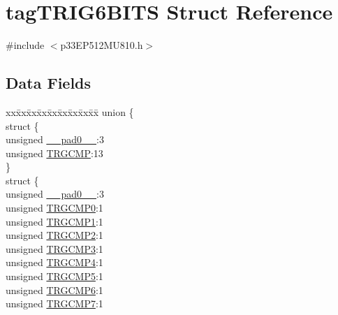\hypertarget{structtag_t_r_i_g6_b_i_t_s}{}\section{tag\+T\+R\+I\+G6\+B\+I\+TS Struct Reference}
\label{structtag_t_r_i_g6_b_i_t_s}


{\ttfamily \#include $<$p33\+E\+P512\+M\+U810.\+h$>$}

\subsection*{Data Fields}
\begin{DoxyCompactItemize}
\item 
\begin{tabbing}
xx\=xx\=xx\=xx\=xx\=xx\=xx\=xx\=xx\=\kill
union \{\\
\>struct \{\\
\>\>unsigned \hyperlink{structtag_t_r_i_g6_b_i_t_s_adf71f3d8410c1f1dbbc96680a92c49af}{\_\_pad0\_\_}:3\\
\>\>unsigned \hyperlink{structtag_t_r_i_g6_b_i_t_s_aceafdcd310f8a6833f64c9d20ec5567e}{TRGCMP}:13\\
\>\} \\
\>struct \{\\
\>\>unsigned \hyperlink{structtag_t_r_i_g6_b_i_t_s_adf71f3d8410c1f1dbbc96680a92c49af}{\_\_pad0\_\_}:3\\
\>\>unsigned \hyperlink{structtag_t_r_i_g6_b_i_t_s_a592102a5d0362674b8b287b5f8dd9f2a}{TRGCMP0}:1\\
\>\>unsigned \hyperlink{structtag_t_r_i_g6_b_i_t_s_ab2a016c04074d53199dbd32df07c6d09}{TRGCMP1}:1\\
\>\>unsigned \hyperlink{structtag_t_r_i_g6_b_i_t_s_a1fd283d3a2f1005e0d597b4e61399485}{TRGCMP2}:1\\
\>\>unsigned \hyperlink{structtag_t_r_i_g6_b_i_t_s_a823f89a0ad77efa6c3c8d01c3932f03e}{TRGCMP3}:1\\
\>\>unsigned \hyperlink{structtag_t_r_i_g6_b_i_t_s_a2bf01f968c2bba2453f76d1590c70490}{TRGCMP4}:1\\
\>\>unsigned \hyperlink{structtag_t_r_i_g6_b_i_t_s_a6dc78e81c5a3e6993b4558dff9657ee2}{TRGCMP5}:1\\
\>\>unsigned \hyperlink{structtag_t_r_i_g6_b_i_t_s_a9ba81e821299317a829e795392b93beb}{TRGCMP6}:1\\
\>\>unsigned \hyperlink{structtag_t_r_i_g6_b_i_t_s_aa801131b5ab0b542a360d202275ea4fd}{TRGCMP7}:1\\

\end{tabbing}
\end{DoxyCompactItemize}
